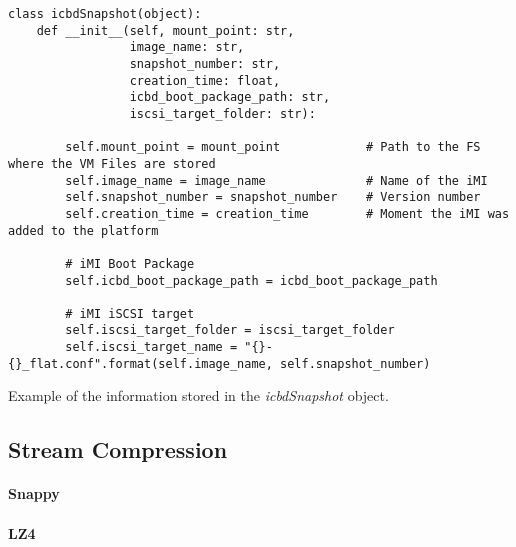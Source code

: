 \begin{listing}[h!]
\begin{verbatim}
class icbdSnapshot(object):
    def __init__(self, mount_point: str,
                 image_name: str,
                 snapshot_number: str,
                 creation_time: float,
                 icbd_boot_package_path: str,
                 iscsi_target_folder: str):

        self.mount_point = mount_point            # Path to the FS where the VM Files are stored
        self.image_name = image_name              # Name of the iMI
        self.snapshot_number = snapshot_number    # Version number
        self.creation_time = creation_time        # Moment the iMI was added to the platform

        # iMI Boot Package
        self.icbd_boot_package_path = icbd_boot_package_path

        # iMI iSCSI target
        self.iscsi_target_folder = iscsi_target_folder
        self.iscsi_target_name = "{}-{}_flat.conf".format(self.image_name, self.snapshot_number)\end{verbatim}
\caption{Example of the information stored in the \textit{icbdSnapshot} object.}
\label{listing:icbdSnapshot_example}
\end{listing}




\subsection{Stream Compression}
\label{sub:rep_stream_compression}

\paragraph{Snappy}
\label{par:rep_snappy}

\paragraph{LZ4}
\label{par:rep_lz4}


